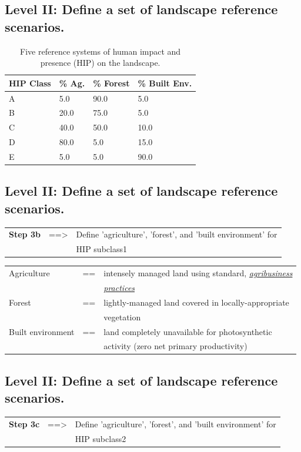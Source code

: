 \documentclass[
paper=128mm:96mm, %
fontsize=11pt, %
pagesize, %
parskip=half-, %
]{scrartcl} %
\theoremstyle{mythmstyle} %
\begin{document}
\subsection{Level II: Define a set of landscape reference scenarios.}
\begin{table}[h]
\footnotesize 
\centering
\begin{tabular}{l l l l}
\toprule
\textbf{HIP Class} & \textbf{\% Ag.} & \textbf{\% Forest} & \textbf{\% Built Env.}\\
\midrule
A & 5.0 & 90.0 & 5.0 \\
B & 20.0 & 75.0 & 5.0 \\
C & 40.0 & 50.0 & 10.0 \\
D & 80.0 & 5.0 & 15.0 \\
E & 5.0 & 5.0 & 90.0 \\
\bottomrule
\end{tabular}
\caption{\scriptsize Five reference systems of human impact and presence (HIP) on the landscape.}
\end{table}

\clearpage
\subsection{Level II: Define a set of landscape reference scenarios.}
\begin{tabular}{lll}
	\textbf{Step 3b} & ==> & Define 'agriculture', 'forest', and 'built environment' for \\
	& & HIP subclass1
\end{tabular} 

\begin{tabular}{lll}
  Agriculture & == &intensely managed land using standard, \underline{\textit{agribusiness}}\\
  & & \underline{\textit{practices}}\\
 Forest & == &lightly-managed land covered in locally-appropriate\\
 & & vegetation\\
 Built environment & == &land completely unavailable for photosynthetic\\
 & & activity (zero net primary productivity)
\end{tabular}

\clearpage
\subsection{Level II: Define a set of landscape reference scenarios.} 
\begin{tabular}{lll}
	\textbf{Step 3c} & ==> & Define 'agriculture', 'forest', and 'built environment' for \\
	& & HIP subclass2
\end{tabular} 
\end{document}
